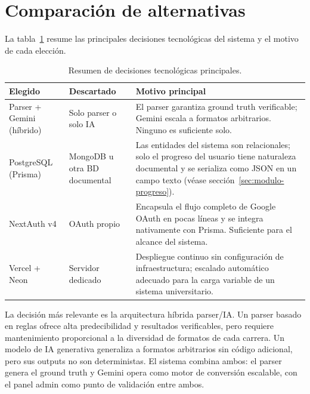 \documentclass[12pt, a4paper]{report}
\begin{document}
\section{Comparación de alternativas}
\label{sec:comparacion-alternativas}

La tabla~\ref{tab:alternativas} resume las principales decisiones tecnológicas del sistema
y el motivo de cada elección.

\begin{table}[htbp]
\centering
\small
\begin{tabular}{p{3.2cm} p{3.2cm} p{7cm}}
\toprule
\textbf{Elegido} & \textbf{Descartado} & \textbf{Motivo principal} \\
\midrule
Parser + Gemini (híbrido)
  & Solo parser o solo IA
  & El parser garantiza ground truth verificable; Gemini escala a formatos arbitrarios.
    Ninguno es suficiente solo. \\
\addlinespace
PostgreSQL (Prisma)
  & MongoDB u otra BD documental
  & Las entidades del sistema son relacionales; solo el progreso del usuario tiene naturaleza
    documental y se serializa como JSON en un campo texto
    (véase sección~\ref{sec:modulo-progreso}). \\
\addlinespace
NextAuth v4
  & OAuth propio
  & Encapsula el flujo completo de Google OAuth en pocas líneas y se integra nativamente
    con Prisma. Suficiente para el alcance del sistema. \\
\addlinespace
Vercel + Neon
  & Servidor dedicado
  & Despliegue continuo sin configuración de infraestructura; escalado automático adecuado
    para la carga variable de un sistema universitario. \\
\bottomrule
\end{tabular}
\caption{Resumen de decisiones tecnológicas principales.}
\label{tab:alternativas}
\end{table}

La decisión más relevante es la arquitectura híbrida parser/IA. Un parser basado en reglas
ofrece alta predecibilidad y resultados verificables, pero requiere mantenimiento
proporcional a la diversidad de formatos de cada carrera. Un modelo de IA generativa
generaliza a formatos arbitrarios sin código adicional, pero sus outputs no son
deterministas. El sistema combina ambos: el parser genera el ground truth y Gemini opera
como motor de conversión escalable, con el panel admin como punto de validación entre
ambos.

\end{document}
